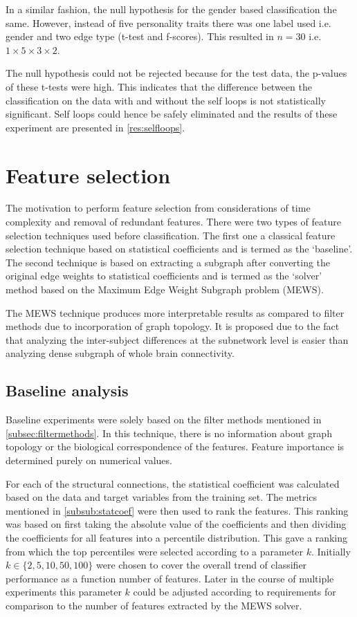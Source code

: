 \documentclass[msthesis.tex]{subfiles}
\begin{document}
In a similar fashion, the null hypothesis for the gender based classification the same. However, instead of five personality traits there was one label used i.e. gender and two edge type (t-test and f-scores). This resulted in $n=30$ i.e. $1 \times 5 \times 3 \times 2$.

The null hypothesis could not be rejected because for the test data, the p-values of these t-tests were high. This indicates that the difference between the classification on the data with and without the self loops is not statistically significant. Self loops could hence be safely eliminated and the results of these experiment are presented in \autoref{res:selfloops}. 

\section{Feature selection} 
The motivation to perform feature selection from considerations of time complexity and removal of redundant features. There were two types of feature selection techniques used before classification. The first one a classical feature selection technique based on statistical coefficients and is termed as the `baseline'. The second technique is based on extracting a subgraph after converting the original edge weights to statistical coefficients and is termed as the `solver' method based on the Maximum Edge Weight Subgraph problem (MEWS). 

The MEWS technique produces more interpretable results as compared to filter methods due to incorporation of graph topology. It is proposed due to the fact that analyzing the inter-subject differences at the subnetwork level is easier than analyzing dense subgraph of whole brain connectivity. 

\subsection{Baseline analysis}
\label{subsec:Baseline_ana}

Baseline experiments were solely based on the filter methods mentioned in \autoref{subsec:filtermethods}. In this technique, there is no information about graph topology or the biological correspondence of the features. Feature importance is determined purely on numerical values.

For each of the structural connections, the statistical coefficient was calculated based on the data and target variables from the training set. The metrics mentioned in \autoref{subsub:statcoef} were then used to rank the features. This ranking was based on first taking the absolute value of the coefficients and then dividing the coefficients for all features into a percentile distribution. This gave a ranking from which the top percentiles were selected according to a parameter $k$. Initially $k \in \{2,5,10,50,100\}$ were chosen to cover the  overall trend of classifier performance as a function number of features. Later in the course of multiple experiments this parameter $k$ could be adjusted according to requirements for comparison to the number of features extracted by the MEWS solver.
\end{document}
